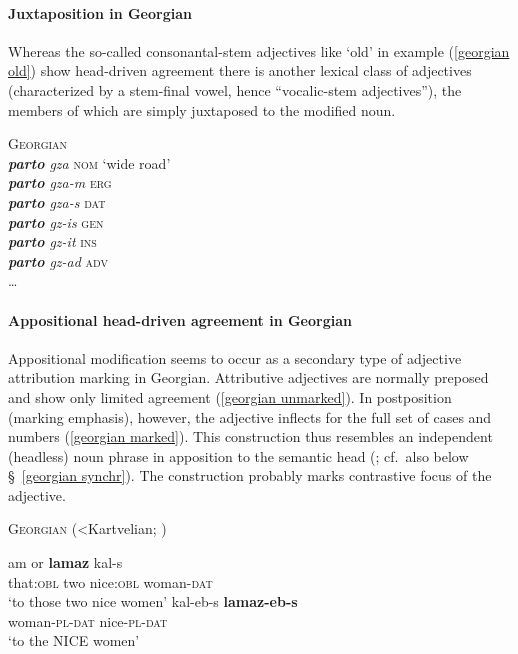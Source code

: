 \paragraph{Juxtaposition in Georgian}
Whereas the so-called consonantal-stem adjectives like ‘old’ in example (\ref{georgian old}) show head-driven agreement there is another lexical class of adjectives (characterized by a stem-final vowel, hence “vocalic-stem adjectives”), the members of which are simply juxtaposed to the modified noun.
\begin{exe}
\ex \textsc{Georgian} \cite[236]{aronson1991}\\
\textit{\textbf{parto} gza} \textsc{nom} ‘wide road’\\
\textit{\textbf{parto} gza-m} \textsc{erg}\\
\textit{\textbf{parto} gza-s} \textsc{dat}\\
\textit{\textbf{parto} gz-is} \textsc{gen}\\
\textit{\textbf{parto} gz-it} \textsc{ins}\\
\textit{\textbf{parto} gz-ad} \textsc{adv}\\
\dots
\end{exe}

\paragraph{Appositional head-driven agreement in Georgian}
Appositional modification seems to occur as a secondary type of adjective attribution marking in Georgian. Attributive adjectives are normally preposed and show only limited agreement (\ref{georgian unmarked}). In postposition (marking emphasis), however, the adjective inflects for the full set of cases and numbers (\ref{georgian marked}). This construction thus resembles an independent (headless) noun phrase in apposition to the semantic head (\citealt[652, 677]{testelec1998}; cf.~also below \S~\ref{georgian synchr}). The construction probably marks contrastive focus of the adjective.
\begin{exe}
\ex \textsc{Georgian} (<Kartvelian; \citealt[652]{testelec1998})
\begin{xlist}
\ex \label{georgian unmarked}
\gll	am or \textbf{lamaz} kal-s\\
	that:\textsc{obl} two nice:\textsc{obl} woman-\textsc{dat}\\
\glt	‘to those two nice women’
\ex \label{georgian marked}
\gll	kal-eb-s \textbf{lamaz-eb-s}\\
	woman-\textsc{pl}-\textsc{dat} nice-\textsc{pl}-\textsc{dat}\\
\glt	‘to the NICE women’
\end{xlist}
\end{exe}

